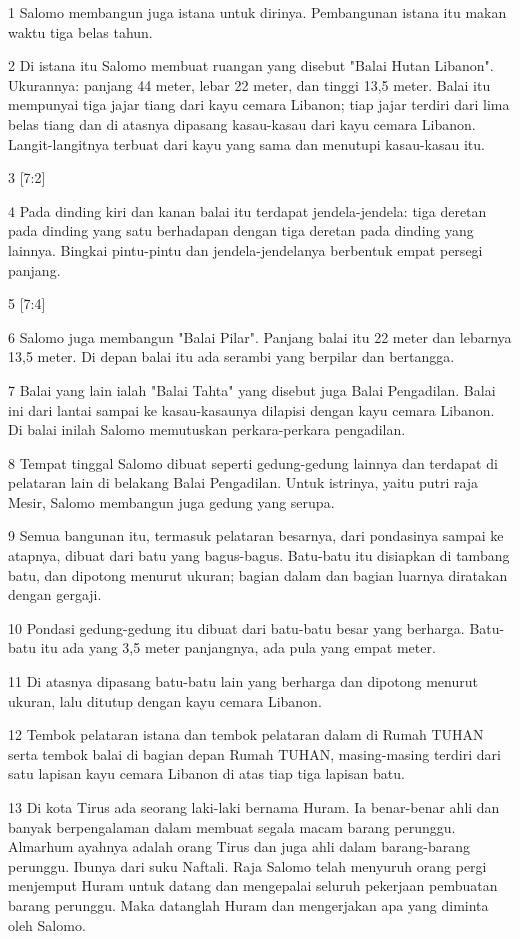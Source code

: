 \par 1 Salomo membangun juga istana untuk dirinya. Pembangunan istana itu makan waktu tiga belas tahun.
\par 2 Di istana itu Salomo membuat ruangan yang disebut "Balai Hutan Libanon". Ukurannya: panjang 44 meter, lebar 22 meter, dan tinggi 13,5 meter. Balai itu mempunyai tiga jajar tiang dari kayu cemara Libanon; tiap jajar terdiri dari lima belas tiang dan di atasnya dipasang kasau-kasau dari kayu cemara Libanon. Langit-langitnya terbuat dari kayu yang sama dan menutupi kasau-kasau itu.
\par 3 [7:2]
\par 4 Pada dinding kiri dan kanan balai itu terdapat jendela-jendela: tiga deretan pada dinding yang satu berhadapan dengan tiga deretan pada dinding yang lainnya. Bingkai pintu-pintu dan jendela-jendelanya berbentuk empat persegi panjang.
\par 5 [7:4]
\par 6 Salomo juga membangun "Balai Pilar". Panjang balai itu 22 meter dan lebarnya 13,5 meter. Di depan balai itu ada serambi yang berpilar dan bertangga.
\par 7 Balai yang lain ialah "Balai Tahta" yang disebut juga Balai Pengadilan. Balai ini dari lantai sampai ke kasau-kasaunya dilapisi dengan kayu cemara Libanon. Di balai inilah Salomo memutuskan perkara-perkara pengadilan.
\par 8 Tempat tinggal Salomo dibuat seperti gedung-gedung lainnya dan terdapat di pelataran lain di belakang Balai Pengadilan. Untuk istrinya, yaitu putri raja Mesir, Salomo membangun juga gedung yang serupa.
\par 9 Semua bangunan itu, termasuk pelataran besarnya, dari pondasinya sampai ke atapnya, dibuat dari batu yang bagus-bagus. Batu-batu itu disiapkan di tambang batu, dan dipotong menurut ukuran; bagian dalam dan bagian luarnya diratakan dengan gergaji.
\par 10 Pondasi gedung-gedung itu dibuat dari batu-batu besar yang berharga. Batu-batu itu ada yang 3,5 meter panjangnya, ada pula yang empat meter.
\par 11 Di atasnya dipasang batu-batu lain yang berharga dan dipotong menurut ukuran, lalu ditutup dengan kayu cemara Libanon.
\par 12 Tembok pelataran istana dan tembok pelataran dalam di Rumah TUHAN serta tembok balai di bagian depan Rumah TUHAN, masing-masing terdiri dari satu lapisan kayu cemara Libanon di atas tiap tiga lapisan batu.
\par 13 Di kota Tirus ada seorang laki-laki bernama Huram. Ia benar-benar ahli dan banyak berpengalaman dalam membuat segala macam barang perunggu. Almarhum ayahnya adalah orang Tirus dan juga ahli dalam barang-barang perunggu. Ibunya dari suku Naftali. Raja Salomo telah menyuruh orang pergi menjemput Huram untuk datang dan mengepalai seluruh pekerjaan pembuatan barang perunggu. Maka datanglah Huram dan mengerjakan apa yang diminta oleh Salomo.
